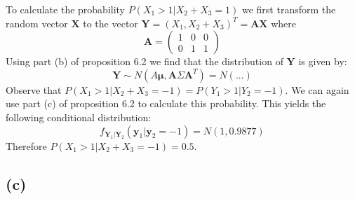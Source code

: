 \documentclass[a4paper]{article}
\begin{document}
To calculate the probability $P(X_1 > 1|X_2+X_3=1)$ we first transform the random vector $\mathbf{X}$ to the vector $\mathbf{Y} = (X_1, X_2+X_3)^T=\mathbf{A}\mathbf{X}$ where
\begin{equation*}
	\mathbf{A} = \begin{pmatrix} 1 & 0 & 0\\ 0 & 1 & 1 \end{pmatrix}
\end{equation*}
Using part (b) of proposition 6.2 we find that the distribution of $\mathbf{Y}$ is given by:
\begin{equation*}
	\mathbf{Y} \sim N(A\mathbf{\mu}, \mathbf{A}\Sigma\mathbf{A}^T) = N(...)
\end{equation*}
Observe that $P(X_1 > 1 | X_2+X_3=-1) = P(Y_1 > 1 | Y_2=-1)$. We can again use part (c) of proposition 6.2 to calculate this probability. This yields the following conditional distribution:
\begin{equation*}
	f_{\mathbf{Y}_1|\mathbf{Y}_2}(\mathbf{y}_1|\mathbf{y}_2=-1) = N(1, 0.9877)
\end{equation*}
Therefore $P(X_1 > 1 | X_2+X_3=-1)=0.5$.

\subsection*{(c)}
\noindent {}
\end{document}
